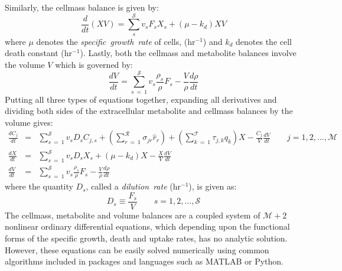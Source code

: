 \documentclass[11pt]{article}
\theoremstyle{definition}
\begin{document}
Similarly, the cellmass balance is given by:
\begin{equation}\label{eqn:general-cellmass-balances}
\frac{d}{dt}\left(XV\right) = \sum_{s}^{\mathcal{S}}v_{s}F_{s}X_{s}+\left(\mu - k_{d}\right)XV
\end{equation}where $\mu$ denotes the \textit{specific~growth~rate} of cells, (hr$^{-1}$) and $k_{d}$ denotes the cell death constant (hr$^{-1}$).
Lastly, both the cellmass and metabolite balances involve the volume $V$ which is governed by:
\begin{equation}
\frac{dV}{dt} = \sum_{s~=~1}^{\mathcal{S}}v_{s}\frac{\rho_{s}}{\rho}F_{s} - \frac{V}{\rho}\frac{d\rho}{dt}
\end{equation}
Putting all three types of equations together, expanding all derivatives and dividing both sides of the extracellular metabolite and cellmass balances by the volume gives:
\begin{eqnarray}\label{eqn-metabolite-dilution-dynamic}
	\frac{dC_{j}}{dt} &=& \sum_{s~=~1}^{\mathcal{S}}v_{s}D_{s}C_{j,s} + \left(\sum_{r~=~1}^{\mathcal{R}}\sigma_{jr}\hat{r}_{r}\right) + \left(\sum_{k~=~1}^{\mathcal{T}}\tau_{j,k}q_{k}\right)X  - \frac{C_{j}}{V}\frac{dV}{dt}\qquad j=1,2,\dots,\mathcal{M}\\
	\frac{dX}{dt} &=& \sum_{s~=~1}^{\mathcal{S}}v_{s}D_{s}X_{s}+\left(\mu - k_{d}\right)X - \frac{X}{V}\frac{dV}{dt}\\
	\frac{dV}{dt} &=& \sum_{s~=~1}^{\mathcal{S}}v_{s}\frac{\rho_{s}}{\rho}F_{s} - \frac{V}{\rho}\frac{d\rho}{dt}
\end{eqnarray}where the quantity $D_{s}$,  called a \textit{dilution~rate} (hr$^{-1}$), is given as:
\begin{equation}
	D_{s} \equiv \frac{F_{s}}{V}\qquad s=1,2,\dots,\mathcal{S}
\end{equation} The cellmass, metabolite and volume balances are a coupled system of $\mathcal{M}+2$ nonlinear ordinary differential equations,
which depending upon the functional forms of the specific growth, death and uptake rates, has no analytic solution.
However, these equations can be easily solved numerically using common algorithms included in packages and languages such as MATLAB or Python.
\end{document}
